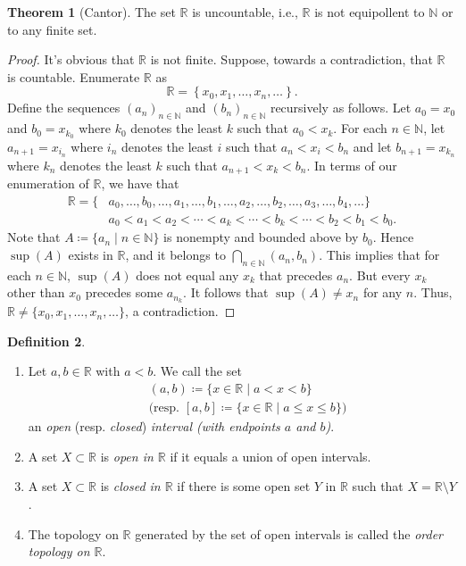 \documentclass[10pt,letterpaper,cm]{nupset}
\theoremstyle{definition}
\newtheorem{definition}{Definition}[subsection]
\theoremstyle{theorem}
\newtheorem{theorem}[definition]{Theorem}
\theoremstyle{remark}
\newcommand{\N}{\mathbb N}
\newcommand{\R}{\mathbb R}
\newcommand{\1}{\mathbf{1}}
\newcommand{\0}{\vec 0}
\begin{document}
\begin{theorem}[Cantor]
The set $\R$ is uncountable, i.e., $\R$ is not equipollent to $\N$ or to any finite set.
\end{theorem}
\begin{proof}
It's obvious that $\R$ is not finite. Suppose, towards a contradiction, that $\R$ is countable. Enumerate $\R$ as $$\R = \left\{x_0, x_1, \ldots, x_n, \ldots\right\}.$$ Define the sequences $\left(a_n\right)_{n\in \N}$ and $\left(b_n\right)_{n\in \N}$ recursively as follows. Let $a_0 = x_0$ and $b_0 = x_{k_0}$ where $k_0$ denotes the least $k$ such that $a_0 < x_k$. For each $n\in \N$, let $a_{n+1}= x_{i_n}$ where $i_n$ denotes the least $i$ such that $a_n < x_i < b_n$ and let $b_{n+1} = x_{k_n}$ where $k_n$ denotes the least $k$ such that $a_{n+1} < x_k < b_n$. In terms of our enumeration of $\R$, we have that
\begin{align*}
  \R = \{& a_0, \ldots, b_0, \ldots, a_1, \ldots, b_1, \ldots, a_2, \ldots, b_2, \ldots, a_3, \ldots, b_4, \ldots\}
  \\ & a_0 < a_1 < a_2 < \cdots < a_k < \cdots < b_k < \cdots < b_2 < b_1 <b_0 .
\end{align*} 
Note that $A\coloneqq \{a_n \mid n\in \N\}$ is nonempty and bounded above by $b_0$. Hence $\sup(A)$ exists in $\R$, and it belongs to $\bigcap_{n\in \N} \left(a_n, b_n\right)$. This implies that for each $n\in \N$, $\sup(A)$ does not equal any $x_k$ that precedes $a_n$. But every $x_k$ other than $x_0$ precedes some $a_{n_k}$.
It follows that $\sup(A) \ne x_n$ for any $n$. Thus, $\R \ne \{x_0, x_1, \ldots, x_n, \ldots\}$, a contradiction.
\end{proof}

\begin{definition} $ $
\begin{enumerate}
\item Let $a, b \in \R$ with $a<b$. We call the set
\begin{align*}
& \left(a,b\right) \coloneqq \{x\in \R \mid a<x<b\}
\\ & \text{(resp. } [a,b]  \coloneqq \{x\in \R \mid a\leq x \leq b\}\text{)}
\end{align*} an  \textit{open} (resp. \textit{closed}) \textit{interval (with endpoints $a$ and $b$)}.
\item A set $X\subset \R$ is \textit{open in $\R$} if it equals a union of open intervals.
\item A set $X\subset \R$ is \textit{closed in $\R$} if there is some open set $Y$ in $\R$ such that $X= \R \setminus Y$. 
\item The topology on $\R$ generated by the set of open intervals is called the \textit{order topology on $\R$}. 
\end{enumerate}
\end{definition}
\end{document}
